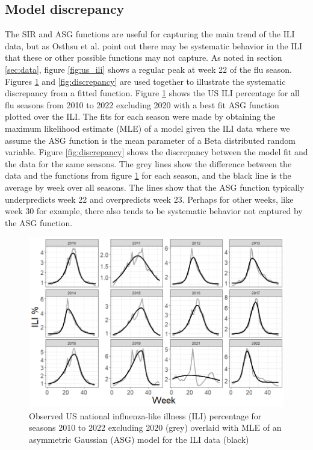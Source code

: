 \subsection{Model discrepancy}


The SIR and ASG functions are useful for capturing the main trend of the ILI 
data, but as Osthsu et al. \cite[]{osthus2019dynamic} point out there may be 
systematic behavior in the ILI that these or other possible functions may not 
capture. As noted in section \ref{sec:data}, figure \ref{fig:us_ili} shows a 
regular peak at week 22 of the flu season. 
Figures \ref{fig:asg_fits} and \ref{fig:discrepancy} are used together to 
illustrate the systematic discrepancy from a fitted function. Figure 
\ref{fig:asg_fits} shows the US ILI percentage for all flu seasons from 2010 
to 2022 excluding 2020 with a best fit ASG function plotted over the ILI. The 
fits for each season were made by obtaining the maximum likelihood estimate 
(MLE) of a model given the ILI data where we assume the ASG function is the 
mean parameter of a Beta distributed random variable. Figure 
\ref{fig:discrepancy} shows the discrepancy between the model fit and the data 
for the same seasons. The grey lines show the difference between the data and 
the functions from figure \ref{fig:asg_fits} for each season, and the black 
line is the average by week over all seasons. The lines show that the ASG 
function typically underpredicts week 22 and overpredicts week 23. Perhaps 
for other weeks, like week 30 for example, there also tends to be systematic 
behavior not captured by the ASG function.


\begin{figure}[hbt!]
    \centering
    \includegraphics[scale=.5]{Images/asg_fits.png}
    \caption{Observed US national influenza-like illness (ILI) percentage for 
    seasons 2010 to 2022 excluding 2020 (grey) overlaid with MLE of an 
    asymmetric Gaussian (ASG) model for the ILI data (black)}
    \label{fig:asg_fits}
\end{figure}

